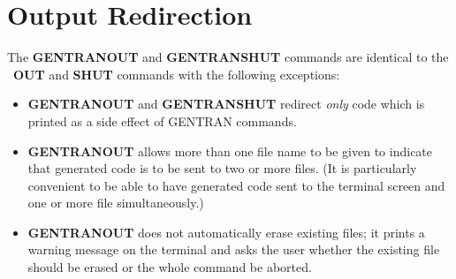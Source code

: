 \section{Output Redirection}\label{GENTRAN:output}

The {\bf GENTRANOUT} and {\bf GENTRANSHUT} commands are identical to
the \REDUCE\ {\bf OUT} and {\bf SHUT} commands with the following
exceptions:

\begin{itemize}
\item {\bf GENTRANOUT} and {\bf GENTRANSHUT} redirect {\it only\/}
code which is printed as a side effect of GENTRAN commands.
\item {\bf GENTRANOUT} allows more than one file name to be given
to indicate that generated code is to be sent to two or more
files.  (It is particularly convenient to be able to
have generated code sent to
the terminal screen and one or more file simultaneously.)
\item {\bf GENTRANOUT} does not automatically erase existing files; it
prints a warning message on the terminal and asks the user whether the
existing file should be erased or the whole command be aborted.
\end{itemize}

